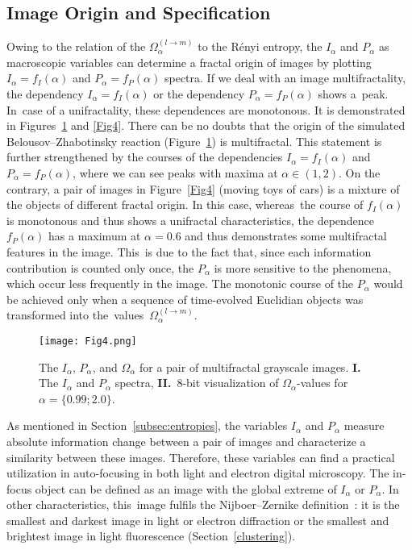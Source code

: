 \documentclass[entropy,article,accept,moreauthors,pdftex,10pt,a4paper]{mdpi}
\begin{document}
\subsection{Image Origin and Specification}
\label{subsec:origin}
Owing to the relation of the $\Omega_\alpha^{(l \rightarrow m)}$ to the R\'{e}nyi entropy, the $I_\alpha$ and $P_\alpha$ as macroscopic variables can determine a fractal origin of images by plotting $I_\alpha = f_I(\alpha)$ and $P_\alpha = f_P(\alpha)$ spectra. If we deal with an image multifractality, the dependency $I_\alpha = f_I(\alpha)$ or the dependency $P_\alpha = f_P(\alpha)$ shows a~peak. In~case of a unifractality, these dependences are monotonous. It is demonstrated in Figures~\ref{Fig5} and \ref{Fig4}. There can be no doubts that the origin of the simulated Belousov--Zhabotinsky reaction (Figure~\ref{Fig5}) is multifractal. This statement is further strengthened by the courses of the dependencies $I_\alpha = f_I(\alpha)$ and $P_\alpha = f_P(\alpha)$, where we can see peaks with maxima at $\alpha \in (1,2)$. On the contrary, a pair of images in Figure~\ref{Fig4} (moving toys of cars) is a mixture of the objects of different fractal origin. In this case, whereas~the course of $f_I(\alpha)$ is monotonous and thus shows a unifractal characteristics, the dependence $f_P(\alpha)$ has a maximum at $\alpha = 0.6$ and thus demonstrates some multifractal features in the image. This~is due to the fact that, since each information contribution is counted only once, the $P_\alpha$ is more sensitive to the phenomena, which occur less frequently in the image. The monotonic course of the $P_\alpha$ would be achieved only when a sequence of time-evolved Euclidian objects was transformed into the~values~$\Omega_\alpha^{(l \rightarrow m)}$.


\begin{figure}[H]
\centering
\texttt{[image: Fig4.png]}
\caption[]{{The} $I_\alpha$, $P_\alpha$, and $\Omega_{\alpha}$ for a pair of multifractal grayscale images. \textbf{I.} The $I_\alpha$ and $P_\alpha$ spectra, \textbf{II.}~8-bit visualization of $\Omega_{\alpha}$-values for $\alpha = \{0.99; 2.0\}$.}
\label{Fig5}
\end{figure}

As mentioned in Section~\ref{subsec:entropies}, the variables $I_\alpha$ and $P_\alpha$ measure absolute information change between a pair of images and characterize a similarity between these images. Therefore, these variables can find a practical utilization in auto-focusing in both light and electron digital microscopy. The in-focus object can be defined as an image with the global extreme of $I_\alpha$ or $P_\alpha$. In other characteristics, this~image fulfils the Nijboer--Zernike definition~\cite{NZT}: it is the smallest and darkest image in light or electron diffraction or the smallest and brightest image in light fluorescence (Section~\ref{clustering}).
\end{document}
